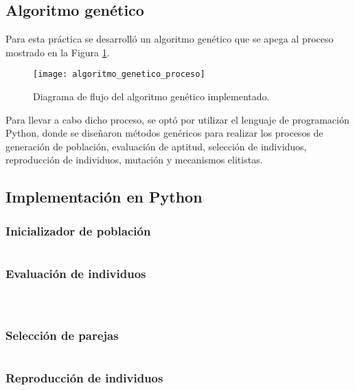 \subsection{Algoritmo genético}
Para esta práctica se desarrolló un algoritmo genético que se apega al proceso mostrado en la Figura \ref{fig:AG}.

\begin{figure}[htbp]
	\centering
	\texttt{[image: algoritmo\_genetico\_proceso]}
	\caption{Diagrama de flujo del algoritmo genético implementado.}
	\label{fig:AG}
\end{figure}

Para llevar a cabo dicho proceso, se optó por utilizar el lenguaje de programación Python, donde se diseñaron métodos genéricos para realizar los procesos de generación de población, evaluación de aptitud, selección de individuos, reproducción de individuos, mutación y mecanismos elitistas.

\subsection{Implementación en Python}

\subsubsection{Inicializador de población}
\inputminted[linenos=true, fontsize=\scriptsize]{Python}{../../utils/population.py}

\subsubsection{Evaluación de individuos}
\inputminted[linenos=true, fontsize=\scriptsize]{Python}{../cities.py}

\inputminted[linenos=true, fontsize=\scriptsize]{Python}{../distance_helper.py}

\inputminted[linenos=true, fontsize=\scriptsize]{Python}{../../utils/aptitude.py}

\subsubsection{Selección de parejas}
\inputminted[linenos=true, fontsize=\scriptsize]{Python}{../../utils/selection.py}

\subsubsection{Reproducción de individuos}
\inputminted[linenos=true, fontsize=\scriptsize]{Python}{../../utils/crossover.py}

